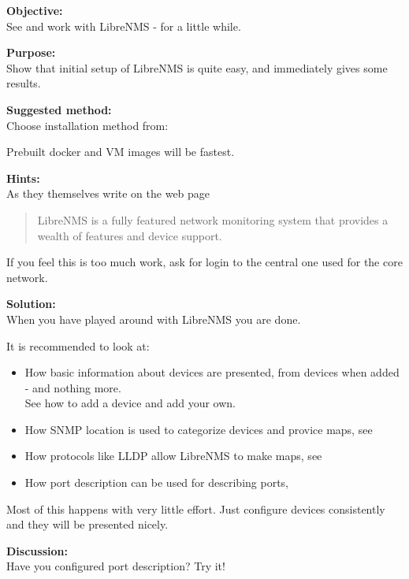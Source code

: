 \documentclass[a4paper,11pt,notitlepage]{report}
\begin{document}
{\bf Objective:}\\
See and work with LibreNMS - for a little while.

{\bf Purpose:}\\
Show that initial setup of LibreNMS is quite easy, and immediately gives some results.

{\bf Suggested method:}\\
Choose installation method from:\\

Prebuilt docker and VM images will be fastest.

{\bf Hints:}\\
As they themselves write on the web page 

\begin{quote}
LibreNMS is a fully featured network monitoring system that provides a wealth of features and device support.
\end{quote}

If you feel this is too much work, ask for login to the central one used for the core network.

{\bf Solution:}\\
When you have played around with LibreNMS you are done.

It is recommended to look at:
\begin{itemize}
\item How basic information about devices are presented, from devices when added - and nothing more.\\
See how to add a device and add your own. 
\item How SNMP location is used to categorize devices and provice maps, see 
\item How protocols like LLDP allow LibreNMS to make maps, see 
\item How port description can be used for describing ports, 
\end{itemize}

Most of this happens with very little effort. Just configure devices consistently and they will be presented nicely.

{\bf Discussion:}\\
Have you configured port description? Try it!
\end{document}
